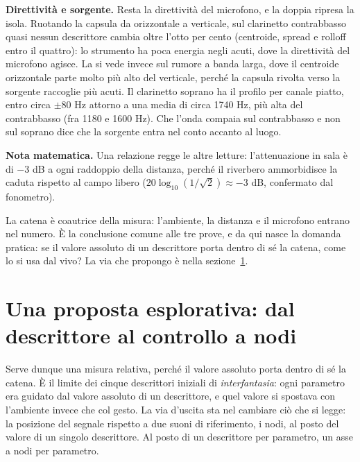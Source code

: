 \documentclass{article}
\newcommand{\brano}{\emph{interfantasia}}
\begin{document}
\medskip\noindent\textbf{Direttività e sorgente.}\quad
Resta la direttività del microfono, e la doppia ripresa la isola. Ruotando la capsula da orizzontale a verticale, sul clarinetto contrabbasso quasi nessun descrittore cambia oltre l'otto per cento (centroide, spread e rolloff entro il quattro): lo strumento ha poca energia negli acuti, dove la direttività del microfono agisce. La si vede invece sul rumore a banda larga, dove il centroide orizzontale parte molto più alto del verticale, perché la capsula rivolta verso la sorgente raccoglie più acuti. Il clarinetto soprano ha il profilo per canale piatto, entro circa $\pm 80$ Hz attorno a una media di circa 1740 Hz, più alta del contrabbasso (fra 1180 e 1600 Hz). Che l'onda compaia sul contrabbasso e non sul soprano dice che la sorgente entra nel conto accanto al luogo.

\medskip\noindent\textbf{Nota matematica.}\quad
Una relazione regge le altre letture: l'attenuazione in sala è di $-3$ dB a ogni raddoppio della distanza, perché il riverbero ammorbidisce la caduta rispetto al campo libero ($20\log_{10}(1/\sqrt{2})\approx-3$ dB, confermato dal fonometro).

La catena è coautrice della misura: l'ambiente, la distanza e il microfono entrano nel numero. È la conclusione comune alle tre prove, e da qui nasce la domanda pratica: se il valore assoluto di un descrittore porta dentro di sé la catena, come lo si usa dal vivo? La via che propongo è nella sezione~\ref{sec:nodi}. %


\section{Una proposta esplorativa: dal descrittore al controllo a nodi}\label{sec:nodi}

Serve dunque una misura relativa, perché il valore assoluto porta dentro di sé la catena. È il limite dei cinque descrittori iniziali di \brano: ogni parametro era guidato dal valore assoluto di un descrittore, e quel valore si spostava con l'ambiente invece che col gesto.
 La via d'uscita sta nel cambiare ciò che si legge: la posizione del segnale rispetto a due suoni di riferimento, i nodi, al posto del valore di un singolo descrittore. Al posto di un descrittore per parametro, un asse a nodi per parametro.
\end{document}
